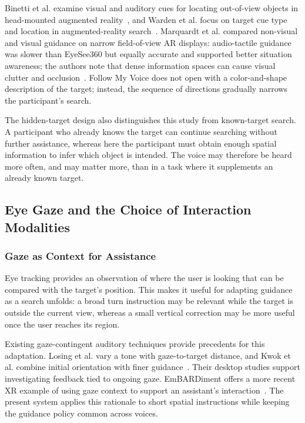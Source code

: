 Binetti et al. examine visual and auditory cues for locating out-of-view objects in head-mounted augmented reality~\cite{binetti2021outofview}, and Warden et al. focus on target cue type and location in augmented-reality search~\cite{warden2022visual}. Marquardt et al. compared non-visual and visual guidance on narrow field-of-view AR displays: audio-tactile guidance was slower than EyeSee360 but equally accurate and supported better situation awareness; the authors note that dense information spaces can cause visual clutter and occlusion~\cite{marquardt2020guidance}. Follow My Voice does not open with a color-and-shape description of the target; instead, the sequence of directions gradually narrows the participant's search.

The hidden-target design also distinguishes this study from known-target search. A participant who already knows the target can continue searching without further assistance, whereas here the participant must obtain enough spatial information to infer which object is intended. The voice may therefore be heard more often, and may matter more, than in a task where it supplements an already known target.

\subsection{Eye Gaze and the Choice of Interaction Modalities}
\subsubsection{Gaze as Context for Assistance}
Eye tracking provides an observation of where the user is looking that can be compared with the target's position. This makes it useful for adapting guidance as a search unfolds: a broad turn instruction may be relevant while the target is outside the current view, whereas a small vertical correction may be more useful once the user reaches its region.

Existing gaze-contingent auditory techniques provide precedents for this adaptation. Losing et al. vary a tone with gaze-to-target distance, and Kwok et al. combine initial orientation with finer guidance~\cite{losing2014guiding,kwok2022twostep}. Their desktop studies support investigating feedback tied to ongoing gaze. EmBARDiment offers a more recent XR example of using gaze context to support an assistant's interaction~\cite{bovo2025embardiment}. The present system applies this rationale to short spatial instructions while keeping the guidance policy common across voices.

